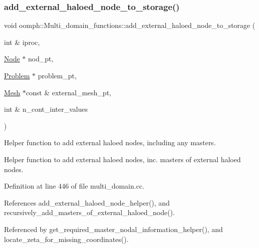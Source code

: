 \subsubsection{\texorpdfstring{add\+\_\+external\+\_\+haloed\+\_\+node\+\_\+to\+\_\+storage()}{add\_external\_haloed\_node\_to\_storage()}}
{\footnotesize\ttfamily void oomph\+::\+Multi\+\_\+domain\+\_\+functions\+::add\+\_\+external\+\_\+haloed\+\_\+node\+\_\+to\+\_\+storage (\begin{DoxyParamCaption}\item[{int \&}]{iproc,  }\item[{\hyperlink{classoomph_1_1Node}{Node} $\ast$}]{nod\+\_\+pt,  }\item[{\hyperlink{classoomph_1_1Problem}{Problem} $\ast$}]{problem\+\_\+pt,  }\item[{\hyperlink{classoomph_1_1Mesh}{Mesh} $\ast$const \&}]{external\+\_\+mesh\+\_\+pt,  }\item[{int \&}]{n\+\_\+cont\+\_\+inter\+\_\+values }\end{DoxyParamCaption})}



Helper function to add external haloed nodes, including any masters. 

Helper function to add external haloed nodes, inc. masters of external haloed nodes. 

Definition at line 446 of file multi\+\_\+domain.\+cc.



References add\+\_\+external\+\_\+haloed\+\_\+node\+\_\+helper(), and recursively\+\_\+add\+\_\+masters\+\_\+of\+\_\+external\+\_\+haloed\+\_\+node().



Referenced by get\+\_\+required\+\_\+master\+\_\+nodal\+\_\+information\+\_\+helper(), and locate\+\_\+zeta\+\_\+for\+\_\+missing\+\_\+coordinates().

\mbox{\label{namespaceoomph_1_1Multi__domain__functions_ae63441bb68e6512082f1248c65f6208d}} 
